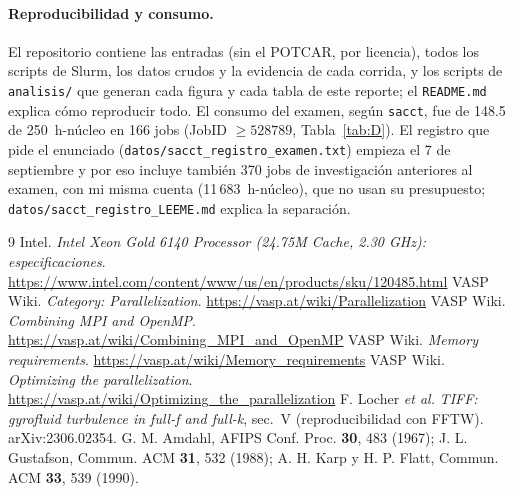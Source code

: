 \documentclass[11pt,a4paper]{article}
\newcommand{\cod}[1]{\texttt{#1}}
\begin{document}
\paragraph{Reproducibilidad y consumo.} El repositorio contiene las entradas (sin el POTCAR, por licencia),
todos los scripts de Slurm, los datos crudos y la evidencia de cada corrida, y los scripts de \cod{analisis/}
que generan cada figura y cada tabla de este reporte; el \cod{README.md} explica cómo reproducir todo. El
consumo del examen, según \cod{sacct}, fue de 148.5 de 250~h-núcleo en 166 jobs (JobID $\geq 528789$,
Tabla~\ref{tab:D}). El registro que pide el enunciado (\cod{datos/sacct\_registro\_examen.txt}) empieza el 7 de
septiembre y por eso incluye también 370 jobs de investigación anteriores al examen, con mi misma cuenta
(11\,683~h-núcleo), que no usan su presupuesto; \cod{datos/sacct\_registro\_LEEME.md} explica la separación.

\begin{thebibliography}{9}\small
{} Intel. \emph{Intel Xeon Gold 6140 Processor (24.75M Cache, 2.30 GHz): especificaciones}.
\url{https://www.intel.com/content/www/us/en/products/sku/120485.html}
 VASP Wiki. \emph{Category: Parallelization}. \url{https://vasp.at/wiki/Parallelization}
 VASP Wiki. \emph{Combining MPI and OpenMP}. \url{https://vasp.at/wiki/Combining_MPI_and_OpenMP}
 VASP Wiki. \emph{Memory requirements}. \url{https://vasp.at/wiki/Memory_requirements}
 VASP Wiki. \emph{Optimizing the parallelization}. \url{https://vasp.at/wiki/Optimizing_the_parallelization}
 F. Locher \emph{et al.} \emph{TIFF: gyrofluid turbulence in full-f and full-k}, sec.~V
(reproducibilidad con FFTW). arXiv:2306.02354.
 G. M. Amdahl, AFIPS Conf. Proc. \textbf{30}, 483 (1967); J. L. Gustafson, Commun. ACM
\textbf{31}, 532 (1988); A. H. Karp y H. P. Flatt, Commun. ACM \textbf{33}, 539 (1990).
\end{thebibliography}
\end{document}
